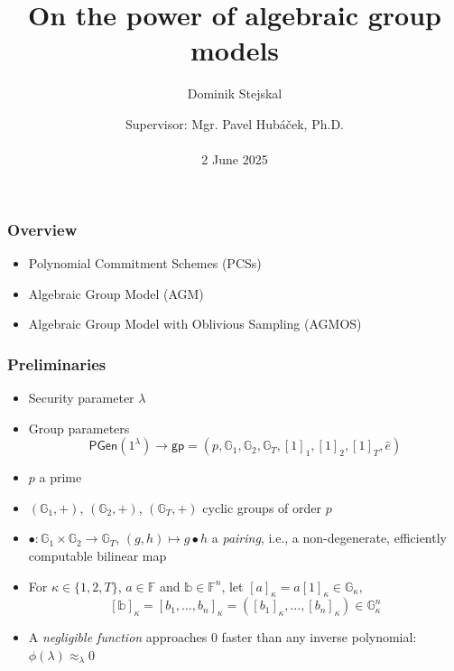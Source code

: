 \documentclass[9pt]{beamer}
\title{On the power of algebraic group models}
\author{Dominik Stejskal}
\date{Supervisor: Mgr. Pavel Hubáček, Ph.D.\\ \, \\2 June 2025}
\newcommand{\Z}{\mathbb{Z}}
\newcommand{\F}{\mathbb{F}}
\newcommand{\G}{\mathbb{G}}
\newcommand{\Pgen}{\mathsf{PGen}}
\newcommand{\negligible}{\approx_{\lambda} 0}
\newcommand{\gp}{\mathsf{gp}}  %
\begin{document}
\frame{\titlepage}




\begin{frame}
\frametitle{Overview}
\begin{itemize}
    \item Polynomial Commitment Schemes (PCSs)
    \item Algebraic Group Model (AGM)
    \item Algebraic Group Model with Oblivious Sampling (AGMOS)
\end{itemize}
\end{frame}


\begin{frame}
\frametitle{Preliminaries}
\begin{itemize}
    \item Security parameter $ \lambda $
    \item Group parameters 
    \[
    \Pgen(1^\lambda) \to \gp = (p, \G_1, \G_2, \G_T, [1]_1, [1]_2, [1]_T, \hat e)
    \]
    \item $ p $ a prime %
    \item $ (\G_1, +) $, $ (\G_2, +) $, $ (\G_T, +) $ cyclic groups of order $ p $
    \item $ \bullet \colon \G_1 \times \G_2 \to \G_T $, $ (g, h) \mapsto g \bullet h $ a \textit{pairing}, i.e., a non-degenerate, efficiently computable bilinear map
    \item For $ \kappa \in \{ 1, 2, T \} $, $ a \in \F $ and $ \mathbb b \in \F^n $, let $ [a]_\kappa = a[1]_\kappa \in \G_\kappa $, 
    \[ 
    [\mathbb b]_\kappa = [b_1, \dots, b_n]_\kappa = ([b_1]_\kappa, \dots, [b_n]_\kappa) \in \G_\kappa^n
    \]
    \item A \textit{negligible function} approaches $ 0 $ faster than any inverse polynomial: $ \phi(\lambda) \negligible $
\end{itemize}
\end{frame}
\end{document}
